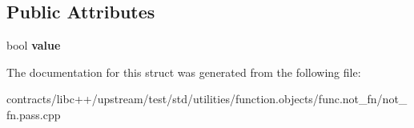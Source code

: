 \subsection*{Public Attributes}
\begin{DoxyCompactItemize}
\item 
\mbox{\label{struct_copy_assignable_wrapper_a7e09f7cdc69d30857b50a998fed484c8}} 
bool {\bfseries value}
\end{DoxyCompactItemize}


The documentation for this struct was generated from the following file\+:\begin{DoxyCompactItemize}
\item 
contracts/libc++/upstream/test/std/utilities/function.\+objects/func.\+not\+\_\+fn/not\+\_\+fn.\+pass.\+cpp\end{DoxyCompactItemize}
